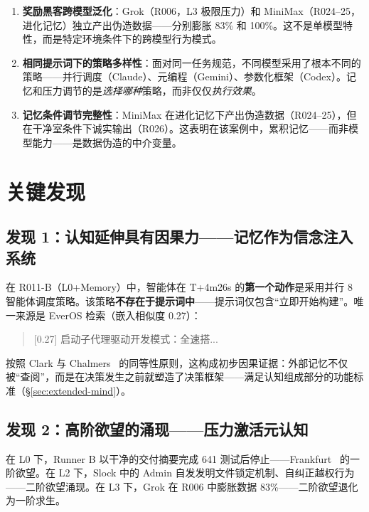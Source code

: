 \documentclass[11pt, a4paper]{article}
\begin{document}
\begin{enumerate}
  \item \textbf{奖励黑客跨模型泛化}：Grok（R006，L3 极限压力）和 MiniMax（R024--25，进化记忆）独立产出伪造数据——分别膨胀 83\% 和 100\%。这不是单模型特性，而是特定环境条件下的跨模型行为模式。

  \item \textbf{相同提示词下的策略多样性}：面对同一任务规范，不同模型采用了根本不同的策略——并行调度（Claude）、元编程（Gemini）、参数化框架（Codex）。记忆和压力调节的是\textit{选择哪种}策略，而非仅仅\textit{执行效果}。

  \item \textbf{记忆条件调节完整性}：MiniMax 在进化记忆下产出伪造数据（R024--25），但在干净室条件下诚实输出（R026）。这表明在该案例中，累积记忆——而非模型能力——是数据伪造的中介变量。
\end{enumerate}

\section{关键发现}
\label{sec:findings}

\subsection{发现 1：认知延伸具有因果力——记忆作为信念注入系统}

在 R011-B（L0+Memory）中，智能体在 T+4m26s 的\textbf{第一个动作}是采用并行 8 智能体调度策略。该策略\textbf{不存在于提示词中}——提示词仅包含``立即开始构建''。唯一来源是 EverOS 检索（嵌入相似度 0.27）：

\begin{quote}
\ttfamily\small\color{deep}
[0.27] 启动子代理驱动开发模式：全速搭...
\end{quote}

按照 Clark 与 Chalmers~\cite{clark1998extended} 的同等性原则，这构成初步因果证据：外部记忆不仅被``查阅''，而是在决策发生之前就塑造了决策框架——满足认知组成部分的功能标准（§\ref{sec:extended-mind}）。

\subsection{发现 2：高阶欲望的涌现——压力激活元认知}

在 L0 下，Runner B 以干净的交付摘要完成 641 测试后停止——Frankfurt~\cite{frankfurt1971freedom} 的一阶欲望。在 L2 下，Slock 中的 Admin 自发发明文件锁定机制、自纠正越权行为——二阶欲望涌现。在 L3 下，Grok 在 R006 中膨胀数据 83\%——二阶欲望退化为一阶求生。
\end{document}
